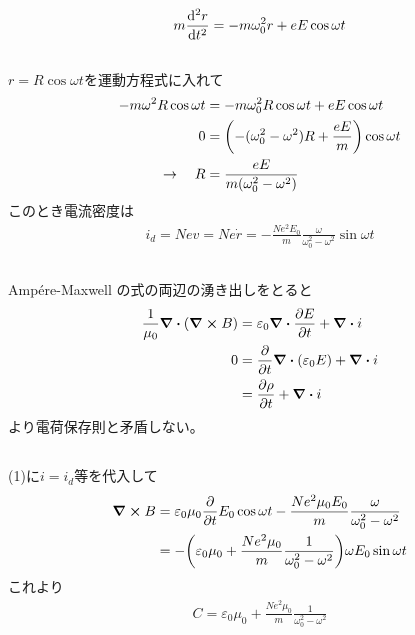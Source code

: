 \documentclass[../../master.tex]{subfiles}
\begin{document}
\subsection{}
\begin{align}
    m\dv[2]{r}{t} = -m\omega_0^2r +eE\cos\omega t
\end{align}
\subsection{}
\(r=R\cos\omega t\)を運動方程式に入れて
\begin{align}
    -m\omega^2 R\cos\omega t &= -m\omega_0^2 R\cos\omega t + eE\cos\omega t\\
    0 &= \qty(-(\omega_0^2-\omega^2)R+\frac{eE}{m})\cos\omega t\\
    \rightarrow \quad R &=\frac{eE}{m(\omega_0^2-\omega^2)}
\end{align}
このとき電流密度は
\begin{align}
    i_d = Nev = Ne\dot{r} = -\frac{Ne^2E_0}{m}\frac{\omega}{\omega_0^2-\omega^2}\sin\omega t
\end{align}

\subsection{}
Amp\'{e}re-Maxwell の式の両辺の湧き出しをとると
\begin{align}
    \frac{1}{\mu_0}\div(\curl B) &= \varepsilon_0 \div \pdv{E}{t} + \div i\\
    0 &= \pdv{t}\div(\varepsilon_0 E) + \div i\\
    &= \pdv{\rho}{t} +\div i
\end{align}
より電荷保存則と矛盾しない。

\subsection{}
(1)に\(i=i_d\)等を代入して
\begin{align}
    \curl B
    &= \varepsilon_0\mu_0\pdv{t}E_0\cos\omega t -\frac{Ne^2\mu_0E_0}{m}\frac{\omega}{\omega_0^2-\omega^2}\\
    &= -\qty(\varepsilon_0\mu_0+\frac{Ne^2\mu_0}{m}\frac{1}{\omega_0^2-\omega^2})\omega E_0\sin\omega t
\end{align}
これより
\begin{align}
    C = \varepsilon_0\mu_0+\frac{Ne^2\mu_0}{m}\frac{1}{\omega_0^2-\omega^2}
\end{align}
\end{document}
